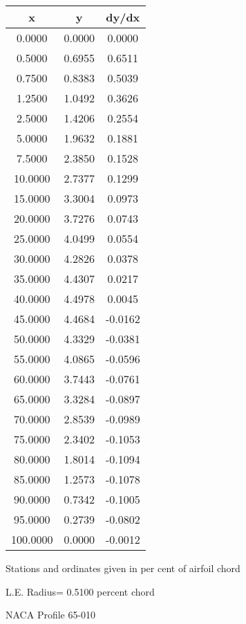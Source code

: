 \documentclass[11pt]{book}
\begin{document}
 \vspace{8mm}
 \begin{tabular}{|c|c|c|} \hline 
  x  &  y  &  dy/dx \\
 \hline
0.0000 & 0.0000 & 0.0000 \\
0.5000 & 0.6955 & 0.6511 \\
0.7500 & 0.8383 & 0.5039 \\
1.2500 & 1.0492 & 0.3626 \\
2.5000 & 1.4206 & 0.2554 \\
5.0000 & 1.9632 & 0.1881 \\
7.5000 & 2.3850 & 0.1528 \\
10.0000 & 2.7377 & 0.1299 \\
15.0000 & 3.3004 & 0.0973 \\
20.0000 & 3.7276 & 0.0743 \\
25.0000 & 4.0499 & 0.0554 \\
30.0000 & 4.2826 & 0.0378 \\
35.0000 & 4.4307 & 0.0217 \\
40.0000 & 4.4978 & 0.0045 \\
45.0000 & 4.4684 & -0.0162 \\
50.0000 & 4.3329 & -0.0381 \\
55.0000 & 4.0865 & -0.0596 \\
60.0000 & 3.7443 & -0.0761 \\
65.0000 & 3.3284 & -0.0897 \\
70.0000 & 2.8539 & -0.0989 \\
75.0000 & 2.3402 & -0.1053 \\
80.0000 & 1.8014 & -0.1094 \\
85.0000 & 1.2573 & -0.1078 \\
90.0000 & 0.7342 & -0.1005 \\
95.0000 & 0.2739 & -0.0802 \\
100.0000 & 0.0000 & -0.0012 \\
 \hline
 \end{tabular}
 \vspace{8mm}


Stations and ordinates given in per cent of airfoil chord 


L.E. Radius=  0.5100 percent chord
 \newpage
  \label{p65-010}
 \begin{Large}
 NACA Profile 65-010
 \end{Large}
  
\end{document}
